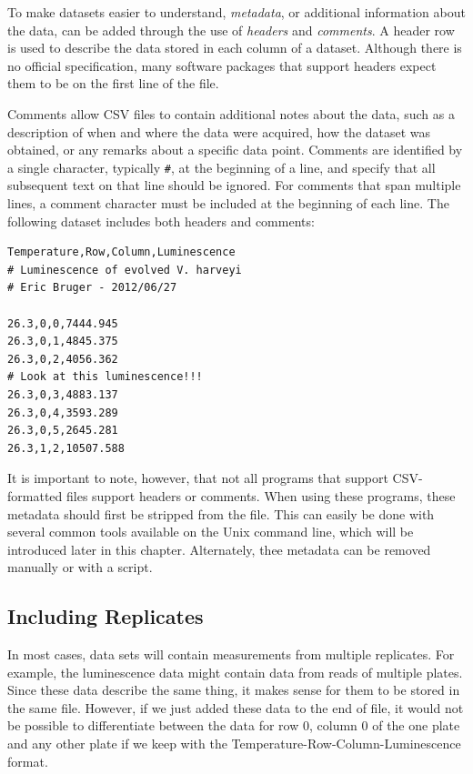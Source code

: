 To make datasets easier to understand, \emph{metadata}, or additional
information about the data, can be added through the use of
\emph{headers} and \emph{comments}. A header row is used to describe the
data stored in each column of a dataset. Although there is no official
specification, many software packages that support headers expect them
to be on the first line of the file.

Comments allow CSV files to contain additional notes about the data,
such as a description of when and where the data were acquired, how the
dataset was obtained, or any remarks about a specific data point.
Comments are identified by a single character, typically \lstinline!#!,
at the beginning of a line, and specify that all subsequent text on that
line should be ignored. For comments that span multiple lines, a comment
character must be included at the beginning of each line. The following
dataset includes both headers and comments:

\begin{lstlisting}
Temperature,Row,Column,Luminescence
# Luminescence of evolved V. harveyi
# Eric Bruger - 2012/06/27

26.3,0,0,7444.945
26.3,0,1,4845.375
26.3,0,2,4056.362
# Look at this luminescence!!!
26.3,0,3,4883.137
26.3,0,4,3593.289
26.3,0,5,2645.281
26.3,1,2,10507.588
\end{lstlisting}
It is important to note, however, that not all programs that support
CSV-formatted files support headers or comments. When using these
programs, these metadata should first be stripped from the file. This
can easily be done with several common tools available on the Unix
command line, which will be introduced later in this chapter.
Alternately, thee metadata can be removed manually or with a script.

\subsection{Including Replicates}

In most cases, data sets will contain measurements from multiple
replicates. For example, the luminescence data might contain data from
reads of multiple plates. Since these data describe the same thing, it
makes sense for them to be stored in the same file. However, if we just
added these data to the end of file, it would not be possible to
differentiate between the data for row 0, column 0 of the one plate and
any other plate if we keep with the Temperature-Row-Column-Luminescence
format.


